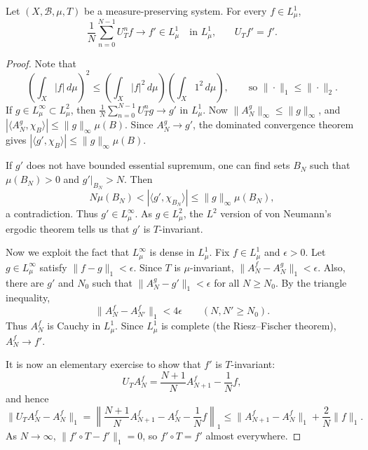 \documentclass[11pt,a4paper]{article}
\begin{document}
\setcounter{theorem}{10}\begin{theorem}
\label{thm:l3-mean-l1}
Let $(X,\mathcal B,\mu,T)$ be a measure-preserving system. For every
$f\in L^1_\mu$,
\[
 \frac1N\sum_{n=0}^{N-1}U_T^nf\longrightarrow f'\in L^1_\mu
 \quad\text{in $L^1_\mu$,}\qquad U_Tf'=f'.
\]
\end{theorem}
\begin{proof}
Note that
\[
 \left(\int_X|f|\,d\mu\right)^2
 \leq\left(\int_X|f|^2\,d\mu\right)
       \left(\int_X1^2\,d\mu\right),
 \qquad\text{so }\|\cdot\|_1\leq\|\cdot\|_2.
\]
If $g\in L^\infty_\mu\subset L^2_\mu$, then
$\frac1N\sum_{n=0}^{N-1}U_T^ng\to g'$ in $L^1_\mu$.
Now $\|A_N^g\|_\infty\leq\|g\|_\infty$, and
$|\langle A_N^g,\chi_B\rangle|\leq\|g\|_\infty\mu(B)$.
Since $A_N^g\to g'$, the dominated convergence theorem gives
$|\langle g',\chi_B\rangle|\leq\|g\|_\infty\mu(B)$.

If $g'$ does not have bounded essential supremum, one can find sets $B_N$
such that $\mu(B_N)>0$ and $g'|_{B_N}>N$. Then
\[
 N\mu(B_N)<|\langle g',\chi_{B_N}\rangle|
 \leq\|g\|_\infty\mu(B_N),
\]
a contradiction. Thus $g'\in L^\infty_\mu$. As $g\in L^2_\mu$, the
$L^2$ version of von Neumann's ergodic theorem tells us that $g'$ is
$T$-invariant.

Now we exploit the fact that $L^\infty_\mu$ is dense in $L^1_\mu$.
Fix $f\in L^1_\mu$ and $\epsilon>0$. Let $g\in L^\infty_\mu$ satisfy
$\|f-g\|_1<\epsilon$. Since $T$ is $\mu$-invariant,
$\|A_N^f-A_N^g\|_1<\epsilon$. Also, there are $g'$ and $N_0$ such that
$\|A_N^g-g'\|_1<\epsilon$ for all $N\geq N_0$.
By the triangle inequality,
\[
 \|A_N^f-A_{N'}^f\|_1<4\epsilon\qquad(N,N'\geq N_0).
\]
Thus $A_N^f$ is Cauchy in $L^1_\mu$. Since $L^1_\mu$ is complete
(the Riesz--Fischer theorem), $A_N^f\to f'$.

It is now an elementary exercise to show that $f'$ is $T$-invariant:
\[
 U_TA_N^f=\frac{N+1}{N}A_{N+1}^f-\frac1Nf,
\]
and hence
\[
 \|U_TA_N^f-A_N^f\|_1
 =\left\|\frac{N+1}{N}A_{N+1}^f-A_N^f-\frac1Nf\right\|_1
 \leq\|A_{N+1}^f-A_N^f\|_1+\frac2N\|f\|_1.
\]
As $N\to\infty$, $\|f'\circ T-f'\|_1=0$, so $f'\circ T=f'$ almost
everywhere.
\end{proof}
\end{document}
